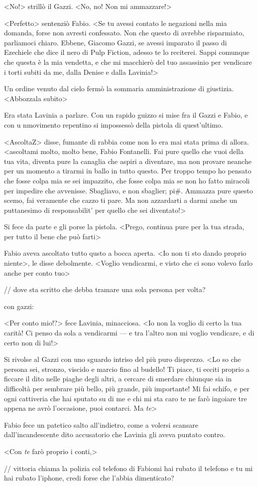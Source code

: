 <No!> strillò il Gazzi. <No, no! Non mi ammazzare!>

<Perfetto> sentenziò Fabio. <Se tu avessi contato le negazioni nella mia domanda, forse non avresti confessato. Non che questo di avrebbe risparmiato, parliamoci chiaro. Ebbene, Giacomo Gazzi, se avessi imparato il passo di Ezechiele che dice il nero di Pulp Fiction, adesso te lo reciterei. Sappi comunque che questa è la mia vendetta, e che mi macchierò del tuo assassinio per vendicare i torti subiti da me, dalla Denise e dalla Lavinia!>

Un ordine venuto dal cielo fermò la sommaria amministrazione di giustizia. <Abbozzala subito>

Era stata Lavinia a parlare. Con un rapido guizzo si mise fra il Gazzi e Fabio, e con u nmovimento repentino si impossessò della pistola di quest'ultimo.

<AscoltaZ> disse, fumante di rabbia come non lo era mai stata prima di allora. <ascoltami molto, molto bene, Fabio Fontanelli. Fai pure quello che vuoi della tua vita, diventa pure la canaglia che aspiri a diventare, ma non provare neanche per un momento a tirarmi in ballo in tutto questo. Per troppo tempo ho pensato che fosse colpa mia se sei impazzito, che fosse colpa mia se non ho fatto miracoli per impedire che avvenisse. Sbagliavo, e non sbaglier; pi#. Ammazza pure questo scemo, fai veramente che cazzo ti pare. Ma non azzardarti a darmi anche un puttanesimo di responsabilit' per quello che sei diventato!>

Si fece da parte e gli porse la pistola. <Prego, continua pure per la tua strada, per tutto il bene che può farti>

Fabio aveva ascoltato tutto qusto a bocca aperta. <Io non ti sto dando proprio niente>, le disse debolmente. <Voglio vendicarmi, e visto che ci sono volevo farlo anche per conto tuo>

// dove sta scritto che debba tramare una sola persona per volta?

con gazzi:

<Per conto mio!?> fece Lavinia, minacciosa.
<Io non la voglio di certo la tua carità! Ci penso da sola a
vendicarmi --- e tra l'altro non mi voglio vendicare, e di certo non di
lui!>

Si rivolse al Gazzi con uno sguardo intriso del più puro disprezzo.
<Lo so che persona sei, stronzo, viscido e marcio fino al
budello! Ti piace, ti ecciti proprio a ficcare il dito nelle piaghe
degli altri, a cercare di smerdare chiunque sia in difficoltà per
sembrare più bello, più grande, più importante! Mi fai schifo, e per
ogni cattiveria che hai sputato su di me e chi mi sta caro te ne farò
ingoiare tre appena ne avrò l'occasione, puoi contarci. Ma
\emph{te}>

Fabio fece un patetico salto all'indietro, come a volersi scansare
dall'incandescente dito accusatorio che Lavinia gli aveva puntato
contro.

<Con \emph{te} farò proprio i conti,>


// vittoria chiama la polizia col telefono di Fabiomi hai rubato il telefono
e tu mi hai rubato l'iphone, credi forse che l'abbia dimenticato?